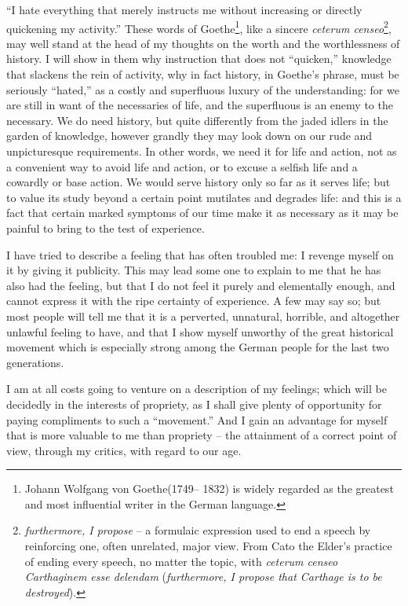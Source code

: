 \enquote{I hate everything that merely instructs me without increasing or
directly quickening my activity.} These words of Goethe\footnote{Johann Wolfgang von Goethe(1749– 1832) is widely regarded as the greatest and most influential writer in the German language.}, like a
sincere \textit{ceterum censeo}\footnote{\textit{furthermore, I propose} -- a formulaic expression used to end a speech by reinforcing one, often unrelated, major view. From Cato the Elder's practice of ending every speech, no matter the topic, with \textit{ceterum censeo Carthaginem esse delendam} (\textit{furthermore, I propose that Carthage is to be destroyed}).}, may well stand at the head of my thoughts
on the worth and the worthlessness of history. I will show in them
why instruction that does not \enquote{quicken,} knowledge that slackens the
rein of activity, why in fact history, in Goethe's phrase, must be
seriously \enquote{hated,} as a costly and superfluous luxury of the
understanding: for we are still in want of the necessaries of life,
and the superfluous is an enemy to the necessary. We do need history,
but quite differently from the jaded idlers in the garden of
knowledge, however grandly they may look down on our rude and
unpicturesque requirements. In other words, we need it for life and
action, not as a convenient way to avoid life and action, or to
excuse a selfish life and a cowardly or base action. We would serve
history only so far as it serves life; but to value its study beyond
a certain point mutilates and degrades life: and this is a fact that
certain marked symptoms of our time make it as necessary as it may be
painful to bring to the test of experience.


I have tried to describe a feeling that has often troubled me: I
revenge myself on it by giving it publicity. This may lead some one
to explain to me that he has also had the feeling, but that I do not
feel it purely and elementally enough, and cannot express it with the
ripe certainty of experience. A few may say so; but most people will
tell me that it is a perverted, unnatural, horrible, and altogether
unlawful feeling to have, and that I show myself unworthy of the
great historical movement which is especially strong among the German
people for the last two generations.

I am at all costs going to venture on a description of my feelings;
which will be decidedly in the interests of propriety, as I shall
give plenty of opportunity for paying compliments to such a
\enquote{movement.} And I gain an advantage for myself that is more valuable
to me than propriety -- the attainment of a correct point of view,
through my critics, with regard to our age.


